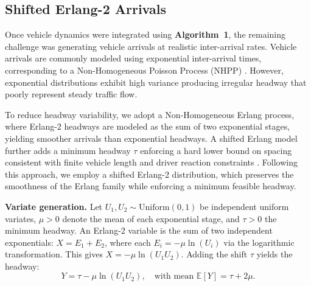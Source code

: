 \documentclass{scspaperproc}
\theoremstyle{scsthe}
\begin{document}
\subsection{Shifted Erlang-2 Arrivals}

Once vehicle dynamics were integrated using \textbf{Algorithm~1}, the remaining challenge was generating vehicle arrivals at realistic inter-arrival rates. Vehicle arrivals are commonly modeled using exponential inter-arrival times, corresponding to a Non-Homogeneous Poisson Process (NHPP) \cite{law2007simulation}. However, exponential distributions exhibit high variance producing irregular headway that poorly represent steady traffic flow.


To reduce headway variability, we adopt a Non-Homogeneous Erlang process, where Erlang-2 headways are modeled as the sum of two exponential stages, yielding smoother arrivals than exponential headways. A shifted Erlang model further adds a minimum headway $\tau$ enforcing a hard lower bound on spacing consistent with finite vehicle length and driver reaction constraints \cite{cowan1975useful}. Following this approach, we employ a shifted Erlang-2 distribution, which preserves the smoothness of the Erlang family while enforcing a minimum feasible headway.



\textbf{Variate generation.} Let $U_1, U_2 \sim \text{Uniform}(0,1)$ be independent uniform variates, $\mu > 0$ denote the mean of each exponential stage, and $\tau > 0$ the minimum headway. An Erlang-2 variable is the sum of two independent exponentials: $X = E_1 + E_2$, where each $E_i = -\mu \ln(U_i)$ via the logarithmic transformation. This gives $X = -\mu \ln(U_1 U_2)$. Adding the shift $\tau$ yields the headway:
\begin{equation}
\label{eq:erlang-variate}
Y = \tau - \mu \ln(U_1 U_2), \quad \text{with mean } \mathbb{E}[Y] = \tau + 2\mu.
\end{equation}
\end{document}
